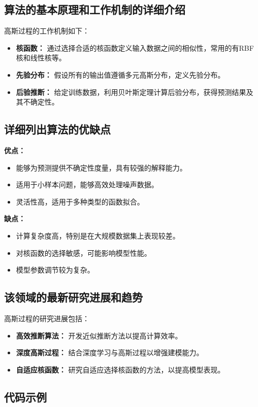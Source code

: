 \subsection*{算法的基本原理和工作机制的详细介绍}
高斯过程的工作机制如下：
\begin{itemize}
    \item \textbf{核函数：} 通过选择合适的核函数定义输入数据之间的相似性，常用的有RBF核和线性核等。
    \item \textbf{先验分布：} 假设所有的输出值遵循多元高斯分布，定义先验分布。
    \item \textbf{后验推断：} 给定训练数据，利用贝叶斯定理计算后验分布，获得预测结果及其不确定性。
\end{itemize}

\subsection*{详细列出算法的优缺点}
\textbf{优点：}
\begin{itemize}
    \item 能够为预测提供不确定性度量，具有较强的解释能力。
    \item 适用于小样本问题，能够高效处理噪声数据。
    \item 灵活性高，适用于多种类型的函数拟合。
\end{itemize}

\textbf{缺点：}
\begin{itemize}
    \item 计算复杂度高，特别是在大规模数据集上表现较差。
    \item 对核函数的选择敏感，可能影响模型性能。
    \item 模型参数调节较为复杂。
\end{itemize}

\subsection*{该领域的最新研究进展和趋势}
高斯过程的研究进展包括：
\begin{itemize}
    \item \textbf{高效推断算法：} 开发近似推断方法以提高计算效率。
    \item \textbf{深度高斯过程：} 结合深度学习与高斯过程以增强建模能力。
    \item \textbf{自适应核函数：} 研究自适应选择核函数的方法，以提高模型表现。
\end{itemize}
\subsection*{代码示例}
\begin{lstlisting}

\end{lstlisting}


